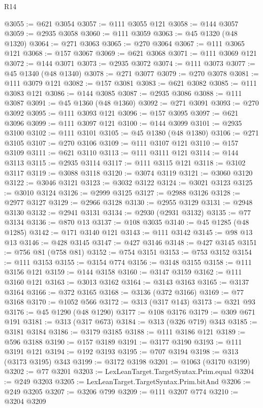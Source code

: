 \begin{lexlean}{R14}
\begin{coremodule}
@3055 := @621 @3054
@3057 := @111 @3055 @121
@3058 := @144 @3057
@3059 := @2935 @3058
@3060 := @111 @3059
@3063 := @45 @1320 (@48 @1320)
@3064 := @271 @3063
@3065 := @270 @3064
@3067 := @111 @3065 @121
@3068 := @157 @3067
@3069 := @621 @3068
@3071 := @111 @3069 @121
@3072 := @144 @3071
@3073 := @2935 @3072
@3074 := @111 @3073
@3077 := @45 @1340 (@48 @1340)
@3078 := @271 @3077
@3079 := @270 @3078
@3081 := @111 @3079 @121
@3082 := @157 @3081
@3083 := @621 @3082
@3085 := @111 @3083 @121
@3086 := @144 @3085
@3087 := @2935 @3086
@3088 := @111 @3087
@3091 := @45 @1360 (@48 @1360)
@3092 := @271 @3091
@3093 := @270 @3092
@3095 := @111 @3093 @121
@3096 := @157 @3095
@3097 := @621 @3096
@3099 := @111 @3097 @121
@3100 := @144 @3099
@3101 := @2935 @3100
@3102 := @111 @3101
@3105 := @45 @1380 (@48 @1380)
@3106 := @271 @3105
@3107 := @270 @3106
@3109 := @111 @3107 @121
@3110 := @157 @3109
@3111 := @621 @3110
@3113 := @111 @3111 @121
@3114 := @144 @3113
@3115 := @2935 @3114
@3117 := @111 @3115 @121
@3118 := @3102 @3117
@3119 := @3088 @3118
@3120 := @3074 @3119
@3121 := @3060 @3120
@3122 := @3046 @3121
@3123 := @3032 @3122
@3124 := @3021 @3123
@3125 := @3010 @3124
@3126 := @2999 @3125
@3127 := @2988 @3126
@3128 := @2977 @3127
@3129 := @2966 @3128
@3130 := @2955 @3129
@3131 := @2948 @3130
@3132 := @2941 @3131
@3134 := @2930 (@2931 @3132)
@3135 := @77 @3134
@3136 := @870 @13
@3137 := @108 @3035
@3140 := @45 @1285 (@48 @1285)
@3142 := @171 @3140 @121
@3143 := @111 @3142
@3145 := @98 @13 @13
@3146 := @428 @3145
@3147 := @427 @3146
@3148 := @427 @3145
@3151 := @756 @81 (@758 @81)
@3152 := @754 @3151
@3153 := @753 @3152
@3154 := @111 @3153
@3155 := @3154 @774
@3156 := @3148 @3155
@3158 := @111 @3156 @121
@3159 := @144 @3158
@3160 := @3147 @3159
@3162 := @111 @3160 @121
@3163 := @3013 @3162
@3164 := @3143 @3163
@3165 := @3137 @3164
@3166 := @372 @3165
@3168 := @3136 (@372 @3166)
@3169 := @77 @3168
@3170 := @1052 @566
@3172 := @313 (@317 @143)
@3173 := @321 @93
@3176 := @45 @1290 (@48 @1290)
@3177 := @108 @3176
@3179 := @309 @671 @191
@3181 := @313 (@317 @673)
@3184 := @313 (@326 @719) @343
@3185 := @3181 @3184
@3186 := @3179 @3185
@3188 := @111 @3186 @121
@3189 := @596 @3188
@3190 := @157 @3189
@3191 := @3177 @3190
@3193 := @111 @3191 @121
@3194 := @192 @3193
@3195 := @707 @3194
@3198 := @313 (@3173 @3195) @343
@3199 := @3172 @3198
@3201 := @1063 (@3170 @3199)
@3202 := @77 @3201
@3203 := LexLeanTarget.TargetSyntax.Prim.equal
@3204 := @249 @3203
@3205 := LexLeanTarget.TargetSyntax.Prim.bitAnd
@3206 := @249 @3205
@3207 := @3206 @799
@3209 := @111 @3207 @774
@3210 := @3204 @3209

\end{coremodule}
\end{lexlean}
